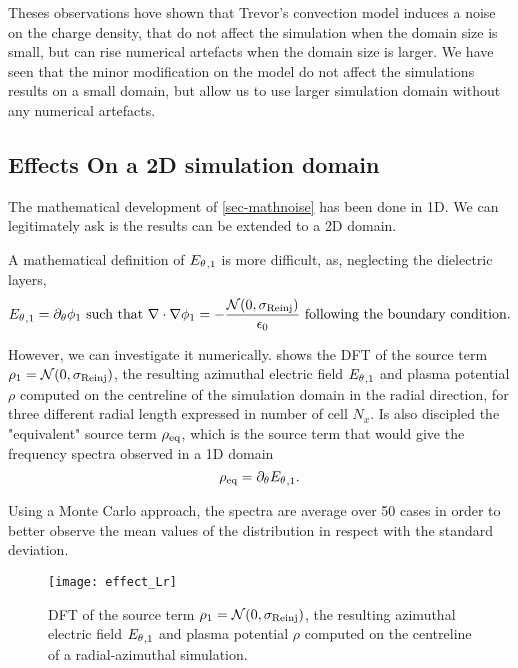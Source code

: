       Theses observations hove shown that Trevor's convection model induces a noise on the charge density, that do not affect the simulation when the domain size is small, but can rise numerical artefacts when the domain size is larger.
      We have seen that the minor modification on the model do not affect the simulations results on a small domain, but allow us to use larger simulation domain without any numerical artefacts.
      
    
    \subsection{Effects On a \ac{2D} simulation domain}
      
      The mathematical development of \cref{sec-mathnoise} has been done in \ac{1D}.
      We can legitimately ask is the results can be extended to a \ac{2D} domain.
      
      A mathematical definition of ${E_{\theta}}_{, 1}$ is more difficult, as, neglecting the dielectric layers,
      \begin{equation} \label{eq-aziE}
        {\ensuremath{E_{\theta}}}_{, 1} = \partial_{\theta} \phi_1 \text{ such that } {\mathbf \nabla} \cdot {\mathbf \nabla} \phi_1 = - \frac { \mathcal{N}(0, \sigma_{\rm Reinj})}{\epsilon_0} \text{ following the boundary condition}.
      \end{equation}
      
      However, we can investigate it numerically.
       shows the \ac{DFT} of the source term $\rho_1 = \mathcal{N}(0, \sigma_{\rm Reinj})$, the resulting azimuthal electric field ${E_{\theta}}_{, 1}$ and plasma potential $\rho$ computed on the centreline of the simulation domain in the radial direction, for three different radial length expressed in number of cell $N_x$.
      Is also discipled the "equivalent" source term $\rho_{\rm eq}$, which is the source term that would give the frequency spectra observed in a \ac{1D} domain
      \begin{equation} \label{eq-equirho}
        \rho_{\rm eq} = \partial_\theta {\ensuremath{E_{\theta}}}_{, 1}.
      \end{equation}
      
      Using a Monte Carlo approach, the spectra are average over 50 cases in order to better observe the mean values of the distribution in respect with the standard deviation.
      
      \begin{figure}[hbtp]
        \centering
        \texttt{[image: effect\_Lr]}
        \caption{\ac{DFT} of the source term $\rho_1 = \mathcal{N}(0, \sigma_{\rm Reinj})$, the resulting azimuthal electric field ${E_{\theta}}_{, 1}$ and plasma potential $\rho$ computed on the centreline of a radial-azimuthal simulation. }
        \label{fig-dftLr}
      \end{figure}
      





